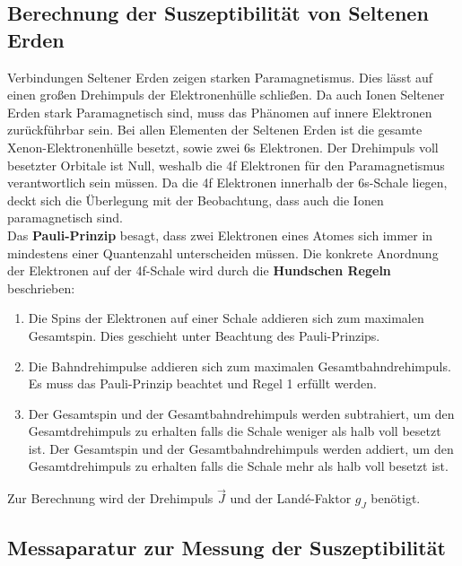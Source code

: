 \subsection{Berechnung der Suszeptibilität von Seltenen Erden}

Verbindungen Seltener Erden zeigen starken Paramagnetismus. 
Dies lässt auf einen großen Drehimpuls der Elektronenhülle schließen.
Da auch Ionen Seltener Erden stark Paramagnetisch sind, muss das Phänomen auf innere Elektronen zurückführbar sein.
Bei allen Elementen der Seltenen Erden ist die gesamte Xenon-Elektronenhülle besetzt, sowie zwei 6s Elektronen.
Der Drehimpuls voll besetzter Orbitale ist Null, weshalb die 4f Elektronen für den Paramagnetismus verantwortlich sein müssen.
Da die 4f Elektronen innerhalb der 6s-Schale liegen, deckt sich die Überlegung mit der Beobachtung, dass auch die Ionen paramagnetisch sind.
\\
Das \textbf{Pauli-Prinzip} besagt, dass zwei Elektronen eines Atomes sich immer in mindestens einer Quantenzahl unterscheiden müssen.
Die konkrete Anordnung der Elektronen auf der 4f-Schale wird durch die \textbf{Hundschen Regeln} beschrieben:
\begin{enumerate}
    \item Die Spins der Elektronen auf einer Schale addieren sich zum maximalen Gesamtspin. Dies geschieht unter Beachtung des Pauli-Prinzips.
    \item Die Bahndrehimpulse addieren sich zum maximalen Gesamtbahndrehimpuls. Es muss das Pauli-Prinzip beachtet und Regel 1 erfüllt werden.
    \item Der Gesamtspin und der Gesamtbahndrehimpuls werden subtrahiert, um den Gesamtdrehimpuls zu erhalten falls die Schale weniger als halb voll besetzt ist. Der Gesamtspin und der Gesamtbahndrehimpuls werden addiert, um den Gesamtdrehimpuls zu erhalten falls die Schale mehr als halb voll besetzt ist.
\end{enumerate}
Zur Berechnung wird der Drehimpuls $\vec{J}$ und der Landé-Faktor $g_J$ benötigt.

\subsection{Messaparatur zur Messung der Suszeptibilität}

